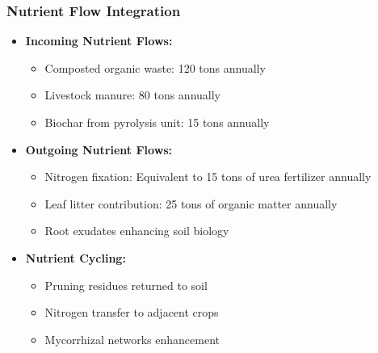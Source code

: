 \subsubsection{Nutrient Flow Integration}
\begin{itemize}
    \item \textbf{Incoming Nutrient Flows:}
    \begin{itemize}
        \item Composted organic waste: 120 tons annually
        \item Livestock manure: 80 tons annually
        \item Biochar from pyrolysis unit: 15 tons annually
    \end{itemize}
    \item \textbf{Outgoing Nutrient Flows:}
    \begin{itemize}
        \item Nitrogen fixation: Equivalent to 15 tons of urea fertilizer annually
        \item Leaf litter contribution: 25 tons of organic matter annually
        \item Root exudates enhancing soil biology
    \end{itemize}
    \item \textbf{Nutrient Cycling:}
    \begin{itemize}
        \item Pruning residues returned to soil
        \item Nitrogen transfer to adjacent crops
        \item Mycorrhizal networks enhancement
    \end{itemize}
\end{itemize}

